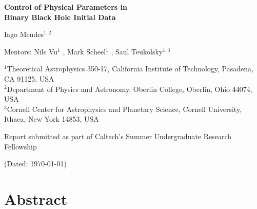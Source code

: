 \documentclass{../document}
\newcommand{\Caltech}{Theoretical Astrophysics 350-17, California Institute of Technology, Pasadena, CA 91125, USA}
\newcommand{\CaltechId}{1}
\newcommand{\Oberlin}{Department of Physics and Astronomy, Oberlin College, Oberlin, Ohio 44074, USA}
\newcommand{\OberlinId}{2}
\newcommand{\Cornell}{Cornell Center for Astrophysics and Planetary Science, Cornell University, Ithaca, New York 14853, USA}
\newcommand{\CornellId}{3}
\begin{document}
  \thispagestyle{plain}

  \vspace*{0.5cm}

  \begin{center}
    \Large\bf
    Control of Physical Parameters in \\
    Binary Black Hole Initial Data
  \end{center}
    
  \begin{center}
    Iago Mendes$^{\CaltechId,\OberlinId}$
  \end{center}

  \begin{flushleft}
    Mentors:
      Nils Vu$^\CaltechId$
        ,
      Mark Scheel$^\CaltechId$
        ,
      Saul Teukolsky$^{\CaltechId,\CornellId}$
  \end{flushleft}
   
  \begin{flushleft}
    \footnotesize
    $^\CaltechId$\Caltech \\
    $^\OberlinId$\Oberlin \\
    $^\CornellId$\Cornell
  \end{flushleft}

  \begin{flushleft}
    Report submitted as part of Caltech's Summer Undergraduate Research Fellowship
  \end{flushleft}

  \begin{center}
    (Dated: \today)
  \end{center}

  \vspace*{0.5cm}

  \section*{Abstract}
\end{document}

